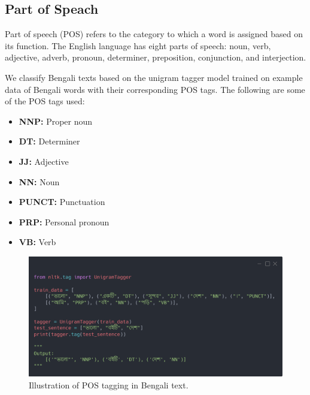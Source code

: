 \subsection{Part of Speach}

Part of speech (POS) refers to the category to which a word is assigned based on its function. The English language has eight parts of speech: noun, verb, adjective, adverb, pronoun, determiner, preposition, conjunction, and interjection.

We classify Bengali texts based on the unigram tagger model trained on example data of Bengali words with their corresponding POS tags. The following are some of the POS tags used:

\begin{itemize}
    \item \textbf{NNP:} Proper noun
    \item \textbf{DT:} Determiner
    \item \textbf{JJ:} Adjective
    \item \textbf{NN:} Noun
    \item \textbf{PUNCT:} Punctuation
    \item \textbf{PRP:} Personal pronoun
    \item \textbf{VB:} Verb
\end{itemize}

\begin{figure}[H]
    \centering
    \includegraphics[width=0.8\linewidth]{Attachments/Figures/part-of-speech_figure1.png}
    \caption{Illustration of POS tagging in Bengali text.}
\end{figure}